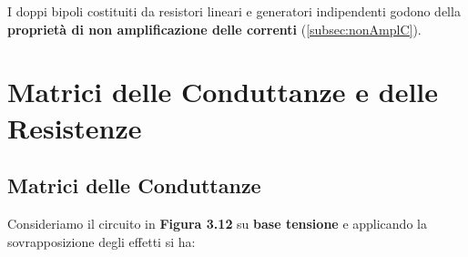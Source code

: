 \documentclass[a4paper]{report}
\begin{document}
\vspace{1cm}

I doppi bipoli costituiti da resistori lineari e generatori
indipendenti godono della {\bf propriet\`a di non amplificazione delle
  correnti} (\ref{subsec:nonAmplC}).

\section{Matrici delle Conduttanze e delle Resistenze}
\subsection{Matrici delle Conduttanze}
Consideriamo il circuito in {\bf Figura 3.12} su {\bf base tensione} e
applicando la sovrapposizione degli effetti si ha:
\end{document}
